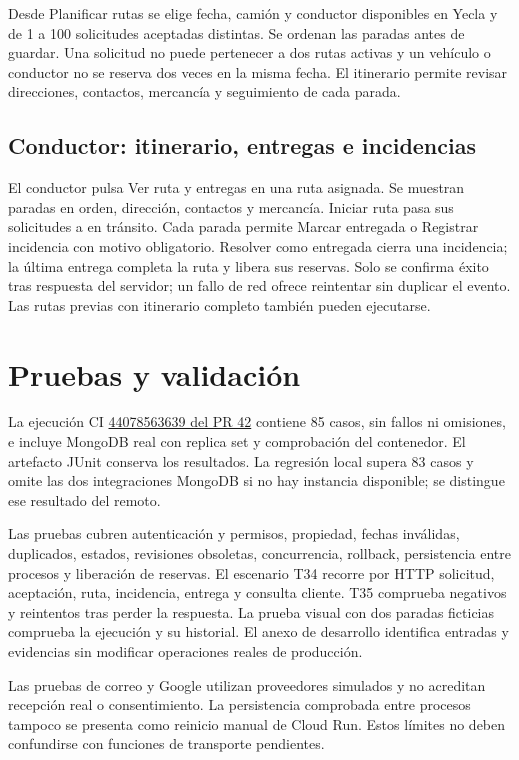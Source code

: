 Desde Planificar rutas se elige fecha, camión y conductor disponibles en Yecla y de 1 a 100 solicitudes aceptadas distintas. Se ordenan las paradas antes de guardar. Una solicitud no puede pertenecer a dos rutas activas y un vehículo o conductor no se reserva dos veces en la misma fecha. El itinerario permite revisar direcciones, contactos, mercancía y seguimiento de cada parada.

\subsection{Conductor: itinerario, entregas e incidencias}
El conductor pulsa Ver ruta y entregas en una ruta asignada. Se muestran paradas en orden, dirección, contactos y mercancía. Iniciar ruta pasa sus solicitudes a en tránsito. Cada parada permite Marcar entregada o Registrar incidencia con motivo obligatorio. Resolver como entregada cierra una incidencia; la última entrega completa la ruta y libera sus reservas. Solo se confirma éxito tras respuesta del servidor; un fallo de red ofrece reintentar sin duplicar el evento. Las rutas previas con itinerario completo también pueden ejecutarse.

\section{Pruebas y validación}
La ejecución CI \href{https://github.com/Miguel-Requena/Procesos26-27/actions/runs/44078563639}{44078563639 del PR 42} contiene 85 casos, sin fallos ni omisiones, e incluye MongoDB real con replica set y comprobación del contenedor. El artefacto JUnit conserva los resultados. La regresión local supera 83 casos y omite las dos integraciones MongoDB si no hay instancia disponible; se distingue ese resultado del remoto.

Las pruebas cubren autenticación y permisos, propiedad, fechas inválidas, duplicados, estados, revisiones obsoletas, concurrencia, rollback, persistencia entre procesos y liberación de reservas. El escenario T34 recorre por HTTP solicitud, aceptación, ruta, incidencia, entrega y consulta cliente. T35 comprueba negativos y reintentos tras perder la respuesta. La prueba visual con dos paradas ficticias comprueba la ejecución y su historial. El anexo de desarrollo identifica entradas y evidencias sin modificar operaciones reales de producción.

Las pruebas de correo y Google utilizan proveedores simulados y no acreditan recepción real o consentimiento. La persistencia comprobada entre procesos tampoco se presenta como reinicio manual de Cloud Run. Estos límites no deben confundirse con funciones de transporte pendientes.

